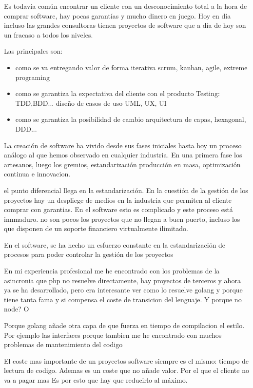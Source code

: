 Es todavía común encontrar un cliente con un desconocimiento total a la hora de comprar software, hay pocas garantías y mucho dinero en juego. Hoy en día incluso las grandes consultoras tienen proyectos de software que a día de hoy son un fracaso a todos los niveles.

Las principales son:

\begin{itemize}
	\item como se va entregando valor de forma iterativa
		\subitem  scrum, kanban, agile, extreme programing 
	\item como se garantiza la expectativa del cliente con el producto
		\subitem Testing: TDD,BDD... diseño de casos de uso UML, UX, UI
	\item como se garantiza la posibilidad de cambio
		\subitem arquitectura de capas, hexagonal, DDD... 
\end{itemize} 

La creación de software ha vivido desde sus fases iniciales hasta hoy un proceso análogo al que hemos observado en cualquier industria. En una primera fase los artesanos, luego los gremios, estandarización producción en masa, optimización continua e innovacion.


el punto diferencial llega en la estandarización. En la cuestión de la gestión de los proyectos hay un despliege de medios en la industria que permiten al cliente comprar con garantias. En el software esto es complicado y este proceso está innmaduro. no son pocos los proyectos que no llegan a buen puerto, incluso los que disponen de un soporte financiero virtualmente ilimitado.


En el software, se ha hecho un esfuerzo constante en la estandarización de procesos para poder controlar la gestión de los proyectos

 En mi experiencia profesional me he encontrado con los problemas de la asincronia que php no resuelve directamente, hay proyectos de terceros y ahora ya se ha desarrollado, pero era interesante ver como lo resuelve golang y porque tiene tanta fama y si compensa el coste de transicion del lenguaje. Y porque no node? O 

Porque golang añade otra capa de que fuerza en tiempo de compilacion el estilo. Por ejemplo las interfaces porque tambien me he encontrado con muchos problemas de mantenimiento del codigo

El coste mas importante de un proyectos software siempre es el mismo: tiempo de lectura de codigo. Ademas es un coste que no añade valor. Por el que el cliente no va a pagar mas
Es por esto que hay que reducirlo al máximo.

